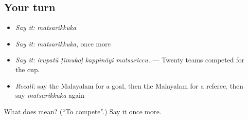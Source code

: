 \subsection*{Your turn}
\begin{itemize}
\raggedright
  \item \emph{Say it:} \emph{matsarikkuka}
  \item \emph{Say it:} \emph{matsarikkuka}, once more
  \item \emph{Say it:} \emph{irupatŭ ṭīmukaḷ kappināyi matsariccu.} — Twenty teams competed for the cup.
  \item \emph{Recall:} say the Malayalam for a goal, then the Malayalam for a referee, then say \emph{matsarikkuka} again
\end{itemize}

\begin{tcolorbox}[breakable,colback=teal!4,colframe=teal!35!black,title={Before you move on}]
What does  mean? (\textquotedblleft{}To compete\textquotedblright{}.) Say it once more.
\end{tcolorbox}
